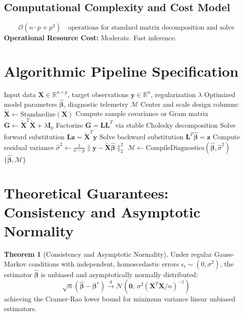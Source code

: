 \documentclass[11pt,a4paper]{article}
\theoremstyle{definition}
\newtheorem{theorem}{\textbf{Theorem}}[section]
\begin{document}
\subsection{Computational Complexity and Cost Model}
\begin{equation}
\mathcal{O}(n \cdot p + p^3) \quad \text{operations for standard matrix decomposition and solve}
\end{equation}
\textbf{Operational Resource Cost:} Moderate. Fast inference.

\section{Algorithmic Pipeline Specification}

\begin{algorithm}[H]
\caption{CatBoost Execution}
\begin{algorithmic}[1]
\Require Input data $\mathbf{X} \in \mathbb{R}^{n \times p}$, target observations $\mathbf{y} \in \mathbb{R}^n$, regularization $\lambda$
\Ensure Optimized model parameters $\hat{\boldsymbol{\beta}}$, diagnostic telemetry $\mathcal{M}$
\State Center and scale design columns: $\tilde{\mathbf{X}} \gets \text{Standardize}(\mathbf{X})$
\State Compute sample covariance or Gram matrix $\mathbf{G} \gets \tilde{\mathbf{X}}^T \tilde{\mathbf{X}} + \lambda \mathbf{I}_p$
\State Factorize $\mathbf{G} = \mathbf{L} \mathbf{L}^T$ via stable Cholesky decomposition
\State Solve forward substitution $\mathbf{L} \mathbf{z} = \tilde{\mathbf{X}}^T \mathbf{y}$
\State Solve backward substitution $\mathbf{L}^T \hat{\boldsymbol{\beta}} = \mathbf{z}$
\State Compute residual variance $\hat{\sigma}^2 \gets \frac{1}{n - p} \| \mathbf{y} - \tilde{\mathbf{X}} \hat{\boldsymbol{\beta}} \|_2^2$
\State $\mathcal{M} \gets \text{CompileDiagnostics}(\hat{\boldsymbol{\beta}}, \hat{\sigma}^2)$
\State \Return $\{\hat{\boldsymbol{\beta}}, \mathcal{M}\}$
\end{algorithmic}
\end{algorithm}

\section{Theoretical Guarantees: Consistency and Asymptotic Normality}

\begin{theorem}[Consistency and Asymptotic Normality]
Under regular Gauss-Markov conditions with independent, homoscedastic errors $\epsilon_i \sim (0, \sigma^2)$, the estimator $\hat{\boldsymbol{\beta}}$ is unbiased and asymptotically normally distributed:
\begin{equation}
\sqrt{n}(\hat{\boldsymbol{\beta}} - \boldsymbol{\beta}^*) \xrightarrow{d} \mathcal{N}\left(\mathbf{0}, \, \sigma^2 (\mathbf{X}^T \mathbf{X} / n)^{-1}\right)
\end{equation}
achieving the Cramer-Rao lower bound for minimum variance linear unbiased estimators.
\end{theorem}
\end{document}
